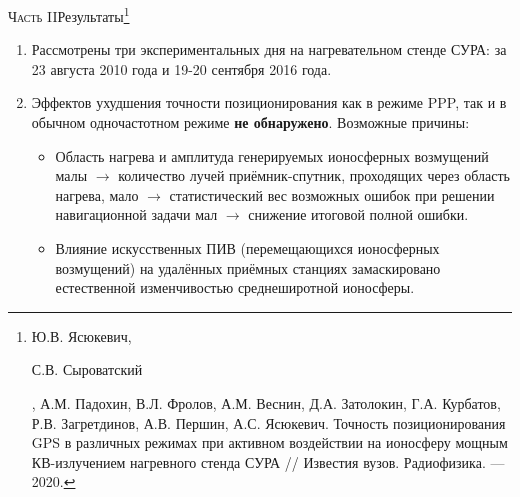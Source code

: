 \begin{frame}{\textsc{Часть II}}{Результаты\footnote[1]{{\tiny\justifying Ю.В. Ясюкевич, \begin{bf}С.В. Сыроватский\end{bf}, А.М. Падохин, В.Л. Фролов, А.М. Веснин, Д.А. Затолокин, Г.А. Курбатов, Р.В. Загретдинов, А.В. Першин, А.С. Ясюкевич. Точность позиционирования GPS в различных режимах при активном воздействии на ионосферу мощным КВ-излучением нагревного стенда СУРА // Известия вузов. Радиофизика. --- 2020.}}}
\begin{enumerate}
\justifying
\item Рассмотрены три экспериментальных дня на нагревательном стенде СУРА: за 23 августа 2010 года и 19-20 сентября 2016 года.
\item Эффектов ухудшения точности позиционирования как в режиме PPP, так и в обычном одночастотном режиме \textbf{не обнаружено}.
Возможные причины:
\begin{itemize}
\justifying
\item Область нагрева и амплитуда генерируемых ионосферных возмущений малы $\rightarrow$ количество лучей приёмник-спутник, проходящих через область нагрева, мало $\rightarrow$ статистический вес возможных ошибок при решении навигационной задачи мал $\rightarrow$ снижение итоговой полной ошибки.  
\item Влияние искусственных ПИВ (перемещающихся ионосферных возмущений) на удалённых приёмных станциях замаскировано естественной изменчивостью среднеширотной ионосферы.
\end{itemize}
\end{enumerate}
\end{frame}